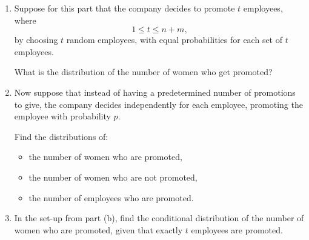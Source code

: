 \documentclass[11pt]{article}
\begin{document}
\begin{enumerate}[label=(\alph*), leftmargin=*]
    \item Suppose for this part that the company decides to promote $t$ employees, where
    \[
    1\le t\le n+m,
    \]
    by choosing $t$ random employees, with equal probabilities for each set of $t$ employees.

    What is the distribution of the number of women who get promoted?

    \item Now suppose that instead of having a predetermined number of promotions to give, the company decides independently for each employee, promoting the employee with probability $p$.

    Find the distributions of:
    \begin{itemize}
        \item the number of women who are promoted,
        \item the number of women who are not promoted,
        \item the number of employees who are promoted.
    \end{itemize}

    \item In the set-up from part (b), find the conditional distribution of the number of women who are promoted, given that exactly $t$ employees are promoted.
\end{enumerate}

\vfill
\end{document}
